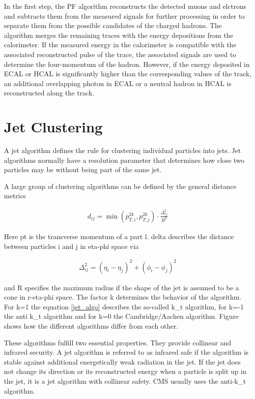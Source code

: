 \documentclass[12pt, a4paper]{thesis}
\begin{document}
In the first step, the PF algorithm reconstructs the detected muons and elctrons
and subtracts them from the measured signals for further processing in order to
separate them from the possible candidates of the charged hadrons. The algorithm
merges the remaining traces with the energy depositions from the calorimeter. If
the measured energy in the calorimeter is compatible with the associated
reconstructed pulse of the trace, the associated signals are used to determine
the four-momentum of the hadron. However, if the energy deposited in ECAL or
HCAL is significantly higher than the corresponding values of the track, an
additional overlapping photon in ECAL or a neutral hadron in HCAL is
reconstructed along the track.

\section{Jet Clustering}
\label{sec:orgfca5f43}

A jet algorithm defines the rule for clustering individual particles into
jets. Jet algorithms normally have a resolution parameter that determines how
close two particles may be without being part of the same jet.

A large group of clustering algorithms can be defined by the general distance
metrics

\begin{align}
d_{ij} = \min(p^{2k}_{T,i}, p^{2k}_{T,j}) \cdot \frac{\Delta^{2}_{ij}}{R^{2}}
\end{align}
\label{jet_algo}

 Here pt is the transverse momentum of a part l. delta describes the
distance between particles i and j in eta-phi space via

 \begin{align}
\Delta_{ij}^{2} = (\eta_{i} - \eta_{j})^{2} + (\phi_{i} - \phi_{j})^{2}
\end{align}

and R specifies the maximum radius if the shape of the jet is assumed to be a
cone in r-eta-phi space. The factor k determines the behavior of the
algorithm. For k=1 the equation \eqref{jet_algo} describes the
so-called k\_t algorithm, for k=-1 the anti k\_t algorithm and for k=0 the
Cambridge/Aachen algorithm. Figure  shows how the different
algorithms differ from each other.

These algorithms fulfill two essential properties. They provide collinear and
infrared security. A jet algorithm is referred to as infrared safe if the
algorithm is stable against additional energetically weak radiation in the
jet. If the jet does not change its direction or its reconstructed energy when a
particle is split up in the jet, it is a jet algorithm with collinear
safety. CMS usually uses the anti-k\_t algorithm.
\end{document}
